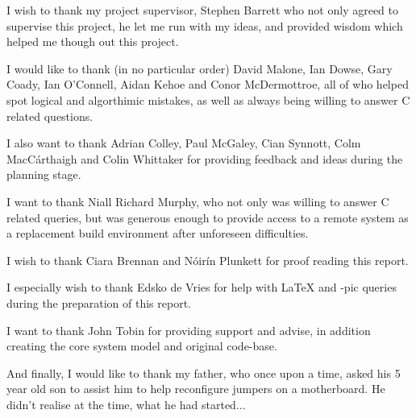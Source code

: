 
I wish to thank my project supervisor, Stephen Barrett who not only
agreed to supervise this project, he let me run with my ideas, and 
provided wisdom which helped me though out this project.

\vspace{5mm}

I would like to thank (in no particular order) David Malone, 
Ian Dowse, Gary Coady, Ian O'Connell, Aidan Kehoe and 
Conor McDermottroe, all of who helped spot logical and algorthimic 
mistakes, as well as always being willing to answer C related 
questions.


I also want to thank Adrian Colley, Paul McGaley, Cian Synnott, Colm
MacC\'{a}rthaigh and Colin Whittaker for providing feedback and ideas 
during the planning stage.


I want to thank Niall Richard Murphy, who not only was willing to answer
C related queries, but was generous enough to provide access to a remote
system as a replacement build environment after unforeseen difficulties.

\vspace{5mm}

I wish to thank Ciara Brennan and N\'{o}ir\'{i}n Plunkett for proof
reading this report. 


I especially wish to thank Edsko de Vries for help with
\textrm{\LaTeX{}}  and \textrm{\Xy-pic} queries during the preparation 
of this report.

\vspace{5mm}

I want to thank John Tobin for providing support and advise, in 
addition creating the core system model and original code-base.

\vspace{5mm}

And finally, I would like to thank my father, who once upon a time, 
asked his 5 year old son to assist him to help reconfigure jumpers on
a motherboard. He didn't realise at the time, what he had started...
